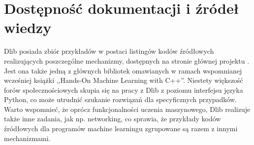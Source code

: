 \section{Dostępność dokumentacji i źródeł wiedzy}

Dlib posiada zbiór przykładów w postaci listingów kodów źródłowych realizujących poszczególne mechanizmy, dostępnych na stronie głównej projektu \cite{dlib:home}. Jest ona także jedną z głównych bibliotek omawianych w ramach wspomnianej wcześniej książki ,,Hands-On Machine Learning with C++''. Niestety większość forów społecznościowych skupia się na pracy z Dlib z poziomu interfejsu języka Python, co może utrudnić szukanie rozwiązań dla specyficznych przypadków. Warto wspomnieć, że oprócz funkcjonalności uczenia maszynowego, Dlib realizuje także inne zadania, jak np. networking, co sprawia, że przykłady kodów źródłowych dla programów machine learningu zgrupowane są razem z innymi mechanizmami. 